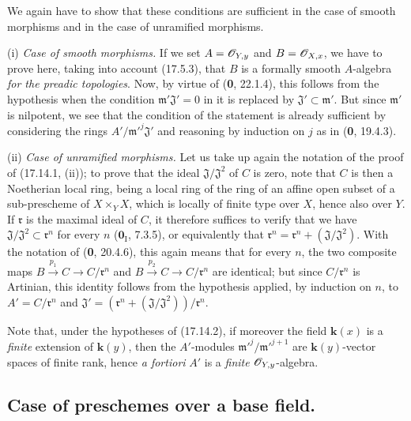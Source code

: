 We again have to show that these conditions are sufficient in the case of smooth morphisms and in the case of unramified morphisms.


(i) \emph{Case of smooth morphisms.} If we set $A=\mathscr{O}_{Y,y}$ and $B=\mathscr{O}_{X,x}$, we have to prove here, taking into account (17.5.3), that $B$ is a formally smooth $A$-algebra \emph{for the preadic topologies}. Now, by virtue of (\textbf{0}, 22.1.4), this follows from the hypothesis when the condition $\mathfrak m'\mathfrak{J}'=0$ in it is replaced by $\mathfrak{J}'\subset\mathfrak m'$. But since $\mathfrak m'$ is nilpotent, we see that the condition of the statement is already sufficient by considering the rings $A'/\mathfrak m'^{j}\mathfrak{J}'$ and reasoning by induction on $j$ as in (\textbf{0}, 19.4.3).

(ii) \emph{Case of unramified morphisms.} Let us take up again the notation of the proof of (17.14.1, (ii)); to prove that the ideal $\mathfrak{J}/\mathfrak{J}^2$ of $C$ is zero, note that $C$ is then a Noetherian local ring, being a local ring of the ring of an affine open subset of a sub-prescheme of $X\times_YX$, which is locally of finite type over $X$, hence also over $Y$. If $\mathfrak r$ is the maximal ideal of $C$, it therefore suffices to verify that we have $\mathfrak{J}/\mathfrak{J}^2\subset\mathfrak r^n$ for every $n$ ($\mathbf{0}_{\mathrm I}$, 7.3.5), or equivalently that $\mathfrak r^n=\mathfrak r^n+(\mathfrak{J}/\mathfrak{J}^2)$. With the notation of (\textbf{0}, 20.4.6), this again means that for every $n$, the two composite maps $B\xrightarrow{p_1}C\to C/\mathfrak r^n$ and $B\xrightarrow{p_2}C\to C/\mathfrak r^n$ are identical; but since $C/\mathfrak r^n$ is Artinian, this identity follows from the hypothesis applied, by induction on $n$, to $A'=C/\mathfrak r^n$ and $\mathfrak{J}'=(\mathfrak r^n+(\mathfrak{J}/\mathfrak{J}^2))/\mathfrak r^n$.

\begin{remark}[17.14.3]
\label{IV.17.14.3}
Note that, under the hypotheses of (17.14.2), if moreover the field $\boldsymbol{k}(x)$ is a \emph{finite} extension of $\boldsymbol{k}(y)$, then the $A'$-modules $\mathfrak m'^{j}/\mathfrak m'^{j+1}$ are $\boldsymbol{k}(y)$-vector spaces of finite rank, hence \emph{a fortiori} $A'$ is a \emph{finite} $\mathscr{O}_{Y,y}$-algebra.
\end{remark}


\subsection{Case of preschemes over a base field.}

